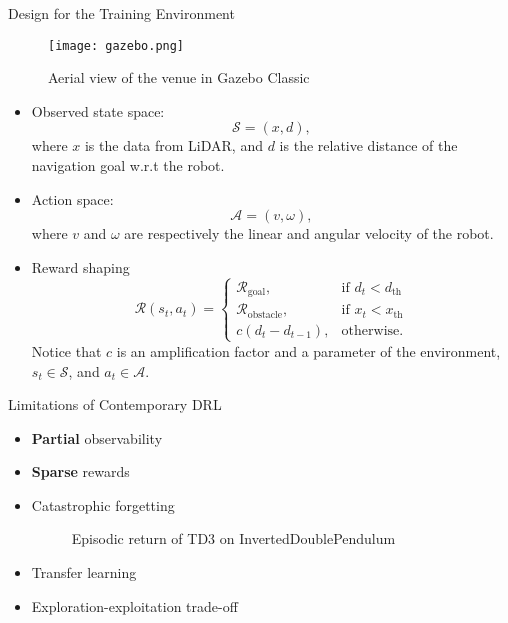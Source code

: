 \begin{frame}[fragile]
\begin{columns}[T]
\begin{column}{.46\textwidth}
\begin{block}{Design for the Training Environment}
\begin{figure}[htbp]
\centering
\texttt{[image: gazebo.png]}
\caption{Aerial view of the venue in Gazebo Classic}
\end{figure}
\begin{itemize}
\item Observed state space:
\begin{equation*}
    \mathcal{S} = (x, d),
\end{equation*}
where $x$ is the data from LiDAR, and $d$ is the relative distance of the navigation goal w.r.t the robot.
\item Action space:
\begin{equation*}
    \mathcal{A} = (v, \omega),
\end{equation*}
where $v$ and $\omega$ are respectively the linear and angular velocity of the robot.
\item Reward shaping
\begin{equation*}
    \mathcal{R}(s_t, a_t) = \begin{cases}
    \mathcal{R}_\text{goal}, &\text{if $d_t < d_\text{th}$}\\
    \mathcal{R}_\text{obstacle}, &\text{if $x_t < x_\text{th}$}\\
    c (d_t - d_{t-1}), &\text{otherwise.}
    \end{cases}
\end{equation*}
Notice that $c$ is an amplification factor and a parameter of the environment, $s_t\in\mathcal{S}$, and $a_t\in\mathcal{A}$.
\end{itemize}
\end{block}

\begin{block}{Limitations of Contemporary DRL}
\begin{itemize}
\item \textbf{Partial} observability
\item \textbf{Sparse} rewards
\item Catastrophic forgetting
    \begin{figure}[htbp]
    \centering
    
    \caption{Episodic return of TD3 on InvertedDoublePendulum}
    \end{figure}
\item Transfer learning
\item Exploration-exploitation trade-off
\end{itemize}
\end{block}


\end{column}
\end{columns}
\end{frame}
